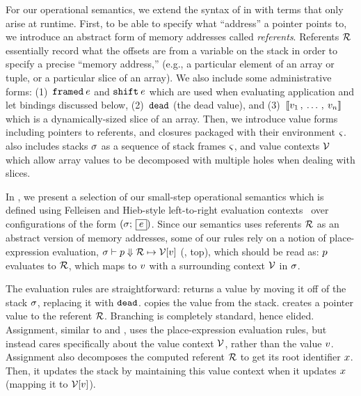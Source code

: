 For our operational semantics, we extend the syntax of \lang in
 with terms that only arise at runtime. First, to be
able to specify what ``address'' a pointer points to, we introduce an abstract
form of memory addresses called \emph{referents}. Referents $\mathcal{R}$
essentially record what the offsets are from a variable on the stack in order to
specify a precise ``memory address,'' (e.g., a particular element of an array or
tuple, or a particular slice of an array). We also include some administrative
forms: (1)~$\mathtt{framed} \: e$ and $\mathtt{shift} \: e$ which are used when
evaluating application and let bindings discussed below, (2)~$\mathtt{dead}$ (the
dead value), and (3)~$\llbracket v_1 \, , \: \ldots \, , \: v_n \rrbracket$ which is a
dynamically-sized slice of an array. Then, we introduce value forms including
pointers to referents, and closures packaged with their environment
$\varsigma$.  also includes stacks $\sigma$ as
a sequence of stack frames $\varsigma$, and value contexts $\mathcal{V}$
which allow array values to be decomposed with multiple holes when dealing with
slices.

In , we present a selection of our small-step operational
semantics which is defined using Felleisen and Hieb-style left-to-right
evaluation contexts~\cite{felleisen92:eval-contexts} over configurations of the
form $(\sigma ; \: \fbox{$e$})$. Since our semantics uses referents $\mathcal{R}$
as an abstract version of memory addresses, some of our rules rely on a notion
of place-expression evaluation,
$ \sigma \vdash p \Downarrow \mathcal{R} \mapsto \mathcal{V} [v] $
(, top), which should be read as: $p$ evaluates to
$\mathcal{R}$, which maps to $v$ with a surrounding context $\mathcal{V}$
in $\sigma$.

The evaluation rules are straightforward:  returns a value by
moving it off of the stack $\sigma$, replacing it with $\mathtt{dead}$.
 copies the value from the stack.  creates a
pointer value to the referent $\mathcal{R}$. Branching is completely standard,
hence elided. Assignment, similar to  and , uses
the place-expression evaluation rules, but instead cares specifically about the
value context $\mathcal{V}$, rather than the value $v$. Assignment also
decomposes the computed referent $\mathcal{R}$ to get its root identifier
$x$. Then, it updates the stack by maintaining this value context when it
updates $x$ (mapping it to $\mathcal{V}[v]$).

